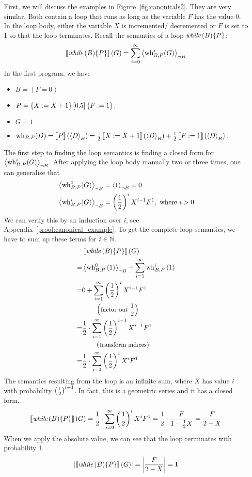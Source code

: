 First, we will discuss the examples in Figure~\ref{fig:canonicals2}.
They are very similar.
Both contain a loop that runs as long as the variable $F$ has the value 0.
In the loop body, either the variable $X$ is incremented/ decremented or $F$ is set to 1 so that the loop terminates.
Recall the semantics of a loop $\textit{while}\,(B) \{P\}$:
\[ \left\llbracket \textit{while}\,(B) \{P\} \right\rrbracket(G) = \sum_{i = 0}^{\infty} \left\langle \operatorname{wh}_{B, P}^i(G) \right\rangle_{\lnot B} \]
In the first program, we have
\begin{itemize}
	\item $B = (F = 0)$
	\item $P = \left\{ X := X + 1 \right\}[0.5]\left\{ F := 1 \right\}$.
	\item $G = 1$
	\item $\operatorname{wh}_{B, P}(D) = \left\llbracket P \right\rrbracket(\left\langle D \right\rangle_{B}) = \frac{1}{2} \left\llbracket X := X + 1 \right\rrbracket(\left\langle D \right\rangle_{B})
		+ \frac{1}{2} \left\llbracket F := 1 \right\rrbracket(\left\langle D \right\rangle_{B})$.
\end{itemize}
The first step to finding the loop semantics is finding a closed form for $\left\langle \operatorname{wh}_{B, P}^i(G) \right\rangle_{\lnot B}$.
After applying the loop body manually two or three times, one can generalise that
\begin{align*}
	& \left\langle \operatorname{wh}_{B, P}^0(G) \right\rangle_{\lnot B} = \left\langle 1 \right\rangle_{\lnot B} = 0 \\
	& \left\langle \operatorname{wh}_{B, P}^i(G) \right\rangle_{\lnot B} = \left( \frac{1}{2} \right)^i X^{i-1} F^1 , \text{ where } i > 0
\end{align*}
We can verify this by an induction over $i$, see Appendix~\ref{proof:canonical_example}.
To get the complete loop semantics, we have to sum up these terms for $i \in \mathbb{N}$.
\begin{align*}
	 & \left\llbracket \textit{while}\,(B) \{P\} \right\rrbracket(G) \\
	=& \left\langle \operatorname{wh}_{B, P}^0 \left(1\right) \right\rangle_{\lnot B} + \sum_{i = 1}^{\infty} \operatorname{wh}_{B, P}^i \left(1\right) \\
	=& 0 + \sum_{i = 1}^{\infty} \left( \frac{1}{2} \right)^i X^{i-1} F^1 \\
	 & \hspace*{2em} \left(\text{\small factor out $\frac{1}{2}$}\right) \\
	=& \frac{1}{2} \cdot \sum_{i = 1}^{\infty} \left( \frac{1}{2} \right)^{i-1} X^{i-1} F^1 \\
	 & \hspace*{2em} \left(\text{\small transform indices}\right) \\
	=& \frac{1}{2} \cdot \sum_{i = 0}^{\infty} \left( \frac{1}{2} \right)^i X^i F^1
\end{align*}
The semantics resulting from the loop is an infinite sum, where $X$ has value $i$ with probability $\left( \frac{1}{2} \right)^{i+1}$.
In fact, this is a geometric series and it has a closed form.
\[ \left\llbracket \textit{while}\,(B) \{P\} \right\rrbracket(G) = \frac{1}{2} \cdot \sum_{i = 0}^{\infty} \left( \frac{1}{2} \right)^i X^i F^1 = \frac{1}{2} \cdot \frac{F}{1 - \frac{1}{2} X} = \frac{F}{2 - X} \]
When we apply the absolute value, we can see that the loop terminates with probability 1.
\[ \left| \left\llbracket \textit{while}\,(B) \{P\} \right\rrbracket(G) \right|  = \left| \frac{F}{2 - X} \right| = 1 \]
